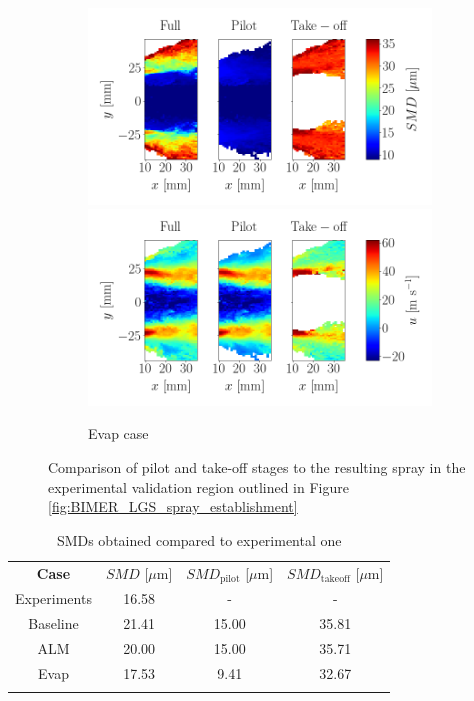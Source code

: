 \begin{figure}[h!]
\begin{subfigure}[b]{1.0\textwidth}
	\centering
	\includegraphics[scale=0.3]{./part3_applications/figures_ch9_lagrangian/simus_pilot_takeoff_comparison/evap_SMD.png}
\hspace*{0.1in}
   \includegraphics[scale=0.3]{./part3_applications/figures_ch9_lagrangian/simus_pilot_takeoff_comparison/evap_u_axial.png}
   \caption{Evap case}
\end{subfigure}
\caption[Comparison of pilot and take-off stages to the resulting
spray ]{Comparison of pilot and take-off stages to the resulting
spray in the experimental validation region outlined in Figure \ref{fig:BIMER_LGS_spray_establishment}}
\label{fig:comparison_pilot_takeoff_maps_BIMER_lgs}
\end{figure}

\clearpage

\begin{table}[!h]
\centering
\caption{SMDs obtained compared to experimental one}
\begin{tabular}{cccc}
\thickhline
\textbf{Case} & $SMD$ [$\mu$m] & $SMD_\mathrm{pilot}$ [$\mu$m] & $SMD_\mathrm{takeoff}$ [$\mu$m]   \\
\thickhline
Experiments & 16.58 & - & - \\
Baseline & 21.41 & 15.00 & 35.81 \\
ALM & 20.00 & 15.00 & 35.71 \\
Evap & 17.53 & 9.41 & 32.67 \\ 
\thickhline
\end{tabular}
\label{tab:BIMER_dispersed_phase_characteristic_times}
\end{table}

